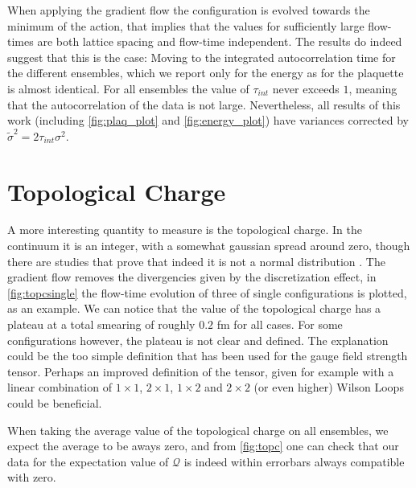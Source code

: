 When applying the gradient flow the configuration is evolved towards the minimum of the action, that implies that the values for sufficiently large flow-times are both lattice spacing and flow-time independent. The results do indeed suggest that this is the case:
Moving to the integrated autocorrelation time for the different ensembles, which we report only for the energy as for the plaquette is almost identical. For all ensembles the value of $\tau_{int}$ never exceeds $1$, meaning that the autocorrelation of the data is not large. Nevertheless, all results of this work (including \cref{fig:plaq_plot} and \cref{fig:energy_plot}) have variances corrected by $\tilde\sigma^2 = 2\tau_{int}\sigma^2$. 

\section{Topological Charge}
A more interesting quantity to measure is the topological charge. In the continuum it is an integer, with a somewhat gaussian spread around zero, though there are studies that prove that indeed it is not a normal distribution \CIT. The gradient flow removes the divergencies given by the discretization effect, in \cref{fig:topcsingle} the flow-time evolution of three of single configurations is plotted, as an example. We can notice that the value of the topological charge has a plateau at a total smearing of roughly  $0.2$ fm for all cases. 
For some configurations however, the plateau is not clear and defined. The explanation could be the too simple definition that has been used for the gauge field strength tensor. Perhaps an improved definition of the tensor, given for example with a linear combination of $1\times 1$, $2\times 1$, $1\times 2$ and $2\times 2$ (or even higher) Wilson Loops could be beneficial.

When taking the average value of the topological charge on all ensembles, we expect the average to be aways zero, and from \cref{fig:topc} one can check that our data for the expectation value of $\mathcal{Q}$ is indeed within errorbars always compatible with zero. 

